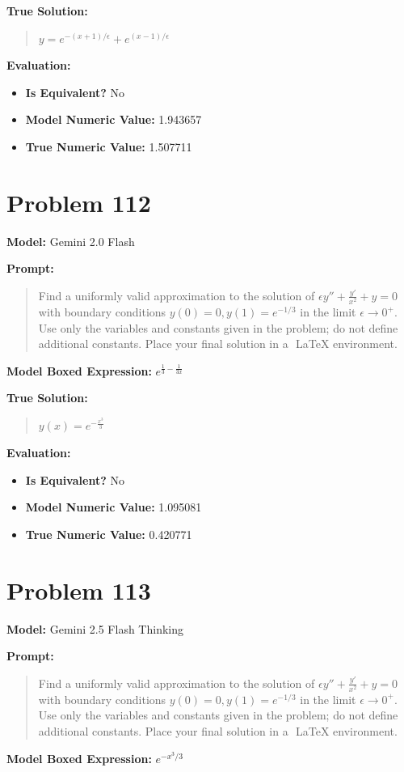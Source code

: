 \documentclass{article}
\begin{document}
{\textbf{True Solution:}
\begin{quote}
$y = e^{-(x+1)/\epsilon} + e^{(x-1)/\epsilon}$
\end{quote}

\textbf{Evaluation:}
\begin{itemize}
\item \textbf{Is Equivalent?} No
\item \textbf{Model Numeric Value:} 1.943657
\item \textbf{True Numeric Value:} 1.507711
\end{itemize}
\vspace{1cm}
\section*{Problem 112}
\textbf{Model:} Gemini 2.0 Flash

\textbf{Prompt:}
\begin{quote}
Find a uniformly valid approximation to the solution of $\epsilon y'' + \frac{y'}{x^2} + y = 0$ with boundary conditions $y(0) = 0, y(1) = e^{-1/3}$ in the limit $\epsilon \to 0^+$. Use only the variables and constants given in the problem; do not define additional constants. Place your final solution in a $\boxed{}$ LaTeX environment.
\end{quote}
\textbf{Model Boxed Expression:} $e^{\frac{1}{3} - \frac{1}{3x}} $

\textbf{True Solution:}
\begin{quote}
$y(x)=e^{-\frac{x^3}{3}}$
\end{quote}

\textbf{Evaluation:}
\begin{itemize}
\item \textbf{Is Equivalent?} No
\item \textbf{Model Numeric Value:} 1.095081
\item \textbf{True Numeric Value:} 0.420771
\end{itemize}
\vspace{1cm}
\section*{Problem 113}
\textbf{Model:} Gemini 2.5 Flash Thinking

\textbf{Prompt:}
\begin{quote}
Find a uniformly valid approximation to the solution of $\epsilon y'' + \frac{y'}{x^2} + y = 0$ with boundary conditions $y(0) = 0, y(1) = e^{-1/3}$ in the limit $\epsilon \to 0^+$. Use only the variables and constants given in the problem; do not define additional constants. Place your final solution in a $\boxed{}$ LaTeX environment.
\end{quote}
\textbf{Model Boxed Expression:} $e^{-x^3/3}$

}
\end{document}
